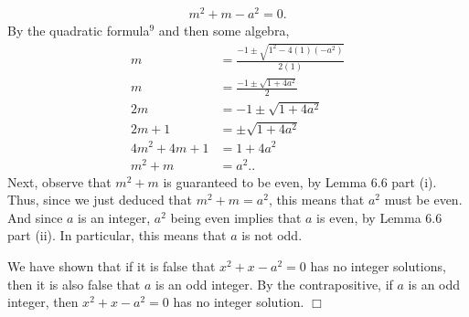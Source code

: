 \documentclass{report}
\begin{document}
\begin{itemize}
\begin{align*}
                m^2 + m - a^2 = 0
            .\end{align*}
            By the quadratic formula\(^9\) and then some algebra,
            \begin{align*}
                m &= \frac{-1 \pm \sqrt{1^2 - 4(1)(-a^2)}}{2(1)} \\
                m &= \frac{-1 \pm \sqrt{1 + 4a^2}}{2} \\
                2m &= -1 \pm \sqrt{1 + 4a^2} \\
                2m + 1 &= \pm \sqrt{1 + 4a^2} \\
                4m^2 + 4m + 1 &= 1 + 4a^2 \\
                m^2 + m &= a^2.
            .\end{align*}
            Next, observe that \(m^2 + m\) is guaranteed to be even, by Lemma 6.6 part (i). Thus, since we just deduced that \(m^2 + m = a^2\), this means that \(a^2\) must be even. And since \(a\) is an integer, \(a^2\) being even implies that \(a\) is even, by Lemma 6.6 part (ii). In particular, this means that \(a\) is not odd.

            We have shown that if it is false that \(x^2 + x - a^2 = 0\) has no integer solutions, then it is also false that \(a\) is an odd integer. By the contrapositive, if \(a\) is an odd integer, then \(x^2 + x - a^2 = 0\) has no integer solution. \(\Box\)







    \end{itemize}

    \pagebreak 
\end{document}
